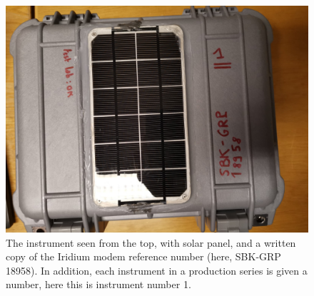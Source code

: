 \documentclass[pdftex,a4paper,12pt,twocolumn,fleqn,captions=tableheading]{scrartcl}
\begin{document}
  \begin{figure}
  \begin{center}
  \includegraphics[width=.8\textwidth]{Figures/IMG_20200616_161755}
  \caption{\label{FromOutside} The instrument seen from the top, with solar panel, and a written copy of the Iridium modem reference number (here, SBK-GRP 18958). In addition, each instrument in a production series is given a number, here this is instrument number 1.}
  \end{center}
  \end{figure}
\end{document}
